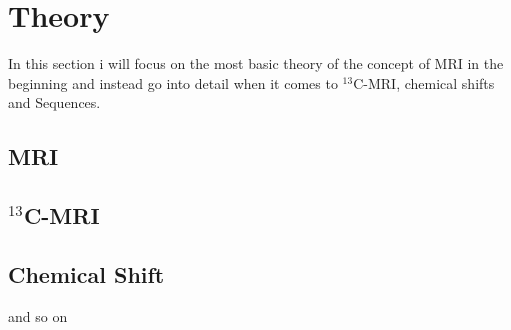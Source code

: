 %
%
%

\section{Theory}
In this section i will focus on the most basic theory of the concept of MRI in the beginning and instead go into detail when it comes to $^{13}$C-MRI, chemical shifts and Sequences.

\subsection{MRI}
\subsection{$^{13}$C-MRI}
\subsection{Chemical Shift}

and so on